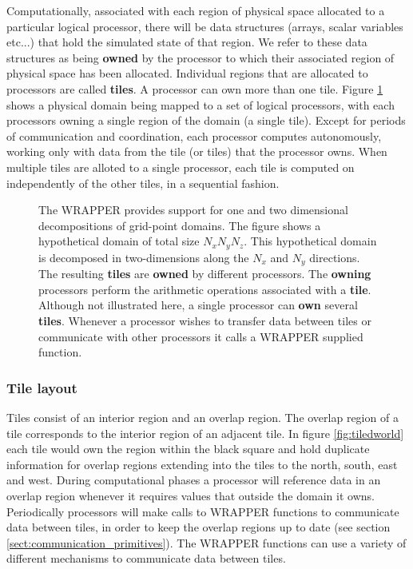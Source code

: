 Computationally, associated with each region of physical 
space allocated to a particular logical processor, there will be data 
structures (arrays, scalar variables etc...) that hold the simulated state of 
that region. We refer to these data structures as being {\bf owned} by the 
processor to which their
associated region of physical space has been allocated. Individual
regions that are allocated to processors are called {\bf tiles}. A 
processor can own more 
than one tile. Figure \ref{fig:domaindecomp} shows a physical domain being
mapped to a set of logical processors, with each processors owning a single 
region of the domain (a single tile). Except for periods of
communication and coordination, each processor computes autonomously, working 
only with data from the tile (or tiles) that the processor owns. When multiple 
tiles are alloted to a single processor, each tile is computed on 
independently of the other tiles, in a sequential fashion. 

\begin{figure}
\begin{center}
\end{center}
\caption{ The WRAPPER provides support for one and two dimensional 
decompositions of grid-point domains. The figure shows a hypothetical domain of 
total size $N_{x}N_{y}N_{z}$. This hypothetical domain is decomposed in 
two-dimensions along the $N_{x}$ and $N_{y}$ directions. The resulting {\bf 
tiles} are {\bf owned} by different processors. The {\bf owning} 
processors perform the 
arithmetic operations associated with a {\bf tile}. Although not illustrated 
here, a single processor can {\bf own} several {\bf tiles}.
Whenever a processor wishes to transfer data between tiles or
communicate with other processors it calls a WRAPPER supplied
function.
} \label{fig:domaindecomp} 
\end{figure}


\subsubsection{Tile layout}

Tiles consist of an interior region and an overlap region. The overlap region 
of a tile corresponds to the interior region of an adjacent tile. 
In figure \ref{fig:tiledworld} each tile would own the region
within the black square and hold duplicate information for overlap
regions extending into the tiles to the north, south, east and west.
During 
computational phases a processor will reference data in an overlap region 
whenever it requires values that outside the domain it owns. Periodically 
processors will make calls to WRAPPER functions to communicate data between 
tiles, in order to keep the overlap regions up to date (see section 
\ref{sect:communication_primitives}). The WRAPPER functions can use a
variety of different mechanisms to communicate data between tiles.

